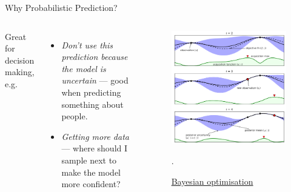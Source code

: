 \documentclass[lualatex, aspectratio=169]{beamer}
\begin{document}
\begin{frame}{Why Probabilistic Prediction?}

  \begin{columns}
    \column{0.5\pagewidth}
    Great for decision making, e.g.
    \begin{itemize}
      \item \emph{Don't use this prediction because the model is uncertain} --- good when predicting something about people.
      \item \emph{Getting more data} --- where should I sample next to make the model more confident?
    \end{itemize}
    \column{0.4\pagewidth}
    \begin{figure}
      \includegraphics[width=0.36\pagewidth]{assets/bayesopt.png}
      \caption{\href{https://towardsdatascience.com/shallow-understanding-on-bayesian-optimization-324b6c1f7083}{Bayesian optimisation}}.
    \end{figure}
  \end{columns}

\end{frame}
\end{document}
